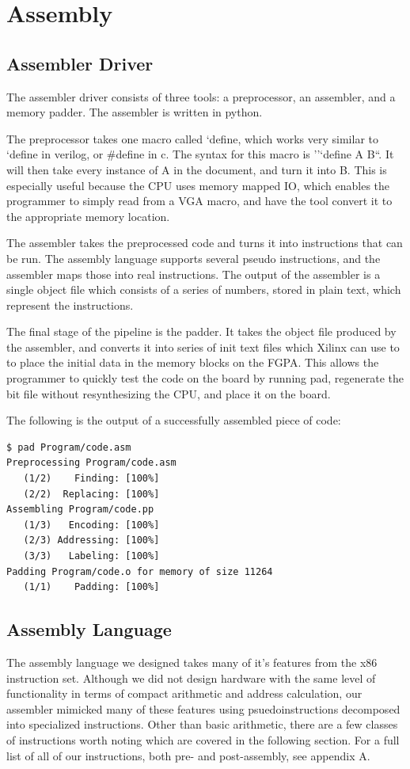 \documentclass[onecolumn]{IEEEtran}
\begin{document}
\section{Assembly}
\subsection{Assembler Driver}
The assembler driver consists of three tools: a preprocessor, an assembler, and a memory padder. The assembler is written in python.

The preprocessor takes one macro called `define, which works very similar to `define in verilog, or \#define in c.   The syntax for this macro is ''`define A B``. It will then take every instance of A in the document, and turn it into B.  This is especially useful because the CPU uses memory mapped IO, which enables the programmer to simply read from a VGA macro, and have the tool convert it to the appropriate memory location.

The assembler takes the preprocessed code and turns it into instructions that can be run.  The assembly language supports several pseudo instructions, and the assembler maps those into real instructions.  The output of the assembler is a single object file which consists of a series of numbers, stored in plain text, which represent the instructions.

The final stage of the pipeline is the padder. It takes the object file produced by the assembler, and converts it into series of init text files which Xilinx can use to to place the initial data in the memory blocks on the FGPA.  This allows the programmer to quickly test the code on the board by running pad, regenerate the bit file without resynthesizing the CPU, and place it on the board.

The following is the output of a successfully assembled piece of code:

\begin{verbatim}
$ pad Program/code.asm
Preprocessing Program/code.asm
   (1/2)    Finding: [100%]
   (2/2)  Replacing: [100%]
Assembling Program/code.pp
   (1/3)   Encoding: [100%]
   (2/3) Addressing: [100%]
   (3/3)   Labeling: [100%]
Padding Program/code.o for memory of size 11264
   (1/1)    Padding: [100%]
\end{verbatim}

\subsection{Assembly Language}
The assembly language we designed takes many of it’s features from the x86 instruction set.  Although we did not design hardware with the same level of functionality in terms of compact arithmetic and address calculation, our assembler mimicked many of these features using psuedoinstructions decomposed into specialized instructions.  Other than basic arithmetic, there are a few classes of instructions worth noting which are covered in the following section.  For a full list of all of our instructions, both pre- and post-assembly, see appendix A.
\end{document}
